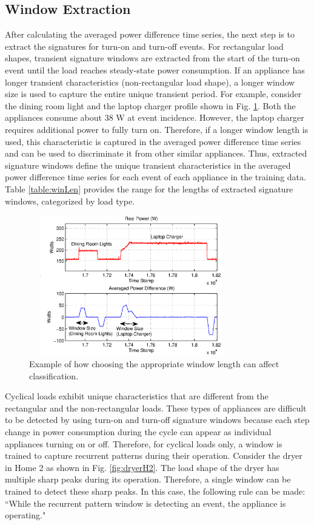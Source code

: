 \documentclass[conference]{IEEEtran}
\begin{document}
\subsection{Window Extraction}
After calculating the averaged power difference time series, the next step is to extract the signatures for turn-on  and turn-off events.  For rectangular load shapes, transient signature windows are extracted from the start of the turn-on event until the load reaches steady-state power consumption.  If an appliance has longer transient characteristics (non-rectangular load shape), a longer window size is used to capture the entire unique transient period.  For example, consider the dining room light and the laptop charger profile shown in Fig. \ref{fig:windowlength}.  Both the appliances consume about 38 W at event incidence.  However, the laptop charger requires additional power to fully turn on.  Therefore, if a longer window length is used, this characteristic is captured in the averaged power difference time series and can be used to discriminate it from other similar appliances. Thus, extracted signature windows define the unique transient characteristics in the averaged power difference time series for each event of each appliance in the training data.  Table \ref{table:winLen} provides the range for the lengths of extracted signature windows, categorized by load type.

\begin{figure}[!t]
	\centering
	\includegraphics[height = 2.4in, width=3.5in]{fig/windowlength.eps}
	\caption{Example of how choosing the appropriate window length can affect classification.}
	\label{fig:windowlength}
\end{figure}

Cyclical loads exhibit unique characteristics that are different from the rectangular and the non-rectangular loads.  These types of appliances are difficult to be detected by using turn-on and turn-off signature windows because each step change in power consumption during the cycle can appear as individual appliances turning on or off. Therefore, for cyclical loads only, a window is trained to capture recurrent patterns during their operation.  Consider the dryer in Home 2 as shown in Fig. \ref{fig:dryerH2}.  The load shape of the dryer has multiple sharp peaks during its operation.  Therefore, a single window can be trained to detect these sharp peaks.  In this case, the following rule can be made:  ``While the recurrent pattern window is detecting an event, the appliance is operating."  
\end{document}
